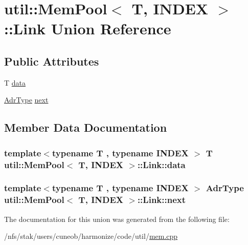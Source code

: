 \hypertarget{unionutil_1_1MemPool_1_1Link}{\section{util\-:\-:Mem\-Pool$<$ T, I\-N\-D\-E\-X $>$\-:\-:Link Union Reference}
\label{unionutil_1_1MemPool_1_1Link}
}
\subsection*{Public Attributes}
\begin{DoxyCompactItemize}
\item 
T \hyperlink{unionutil_1_1MemPool_1_1Link_af0192549fb3b8fe9d7ae139aa23484bf}{data}
\item 
\hyperlink{structutil_1_1MemPool_ace5e7994507896fbdb4e188e3886e73d}{Adr\-Type} \hyperlink{unionutil_1_1MemPool_1_1Link_ac092328a1ceb399fe376c9960bc40506}{next}
\end{DoxyCompactItemize}


\subsection{Member Data Documentation}
\hypertarget{unionutil_1_1MemPool_1_1Link_af0192549fb3b8fe9d7ae139aa23484bf}{
\subsubsection[{data}]{\setlength{\rightskip}{0pt plus 5cm}template$<$typename T , typename I\-N\-D\-E\-X $>$ T {\bf util\-::\-Mem\-Pool}$<$ T, I\-N\-D\-E\-X $>$\-::Link\-::data}}\label{unionutil_1_1MemPool_1_1Link_af0192549fb3b8fe9d7ae139aa23484bf}
\hypertarget{unionutil_1_1MemPool_1_1Link_ac092328a1ceb399fe376c9960bc40506}{
\subsubsection[{next}]{\setlength{\rightskip}{0pt plus 5cm}template$<$typename T , typename I\-N\-D\-E\-X $>$ {\bf Adr\-Type} {\bf util\-::\-Mem\-Pool}$<$ T, I\-N\-D\-E\-X $>$\-::Link\-::next}}\label{unionutil_1_1MemPool_1_1Link_ac092328a1ceb399fe376c9960bc40506}


The documentation for this union was generated from the following file\-:\begin{DoxyCompactItemize}
\item 
/nfs/stak/users/cuneob/harmonize/code/util/\hyperlink{mem_8cpp}{mem.\-cpp}\end{DoxyCompactItemize}
